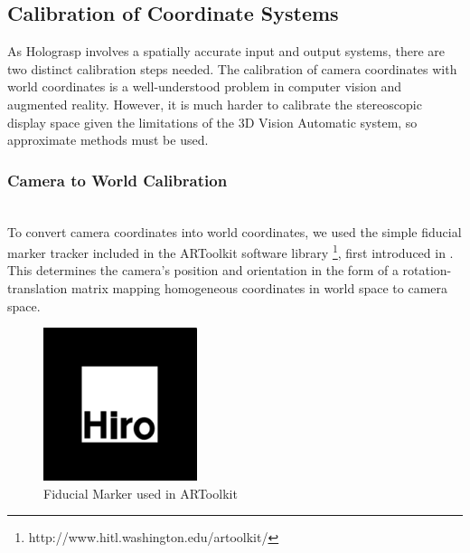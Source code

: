 \documentclass[pageno]{jpaper}
\begin{document}
\subsection{Calibration of Coordinate Systems}
As Holograsp involves a spatially accurate input and output systems, there are two distinct calibration steps needed. The calibration
of camera coordinates with world coordinates is a well-understood problem in computer vision and augmented reality.
However, it is much harder to calibrate the stereoscopic display space given the limitations of the 3D Vision Automatic
system, so approximate methods must be used.
\subsubsection{Camera to World Calibration}$ $\\
To convert camera coordinates into world coordinates, we used the simple fiducial marker tracker included in the ARToolkit software
library \footnote{http://www.hitl.washington.edu/artoolkit/}, first introduced in \cite{artoolkit}. This determines the camera's position
and orientation in the form of a rotation-translation matrix mapping homogeneous coordinates in world space to camera space.

\begin{figure}[h]
\centering
\includegraphics[width=0.4\textwidth]{figures/hiro.png}
\caption{Fiducial Marker used in ARToolkit}
\label{fig:hiro}
\end{figure}
\end{document}
